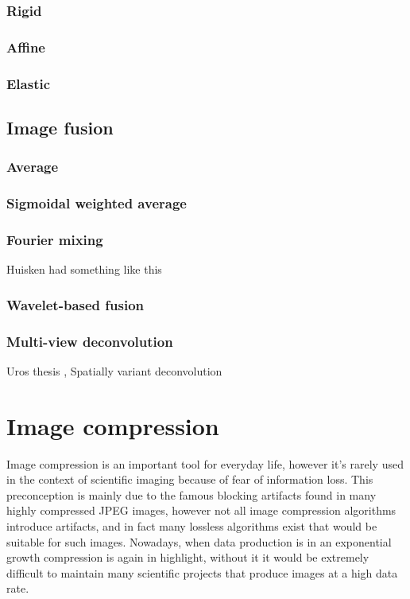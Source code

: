     \subsubsection{Rigid}
    \subsubsection{Affine}
    \subsubsection{Elastic}
  \subsection{Image fusion}
      \subsubsection{Average}
    \subsubsection{Sigmoidal weighted average}
    \subsubsection{Fourier mixing}
    Huisken had something like this
    \subsubsection{Wavelet-based fusion}
    \subsubsection{Multi-view deconvolution}
    
    \cite{krzic_multiple-view_2009} Uros thesis
    \cite{temerinac-ott_multiview_2012}, \cite{temerinac-ott_spatially-variant_2011} Spatially variant deconvolution



\section{Image compression}
  Image compression is an important tool for everyday life, however it's rarely used in the context of scientific imaging because of fear of information loss. This preconception is mainly due to the famous blocking artifacts found in many highly compressed JPEG images, however not all image compression algorithms introduce artifacts, and in fact many lossless algorithms exist that would be suitable for such images. Nowadays, when data production is in an exponential growth compression is again in highlight, without it it would be extremely difficult to maintain many scientific projects that produce images at a high data rate. 

